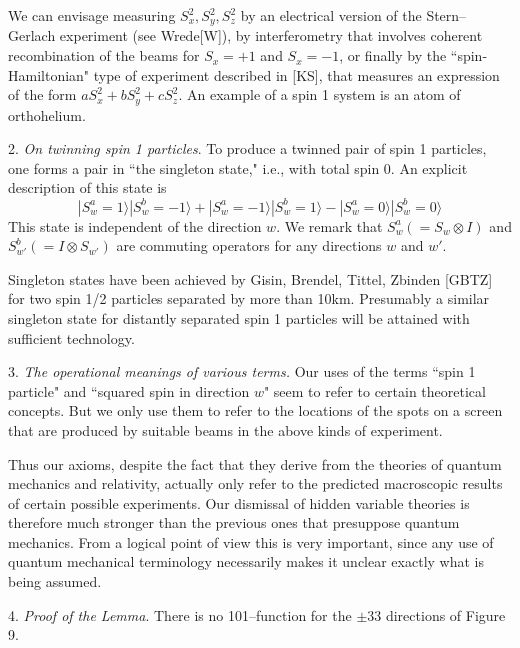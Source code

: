 \documentclass[12pt]{amsart}
\begin{document}
We can envisage measuring $S_x^2, S_y^2, S_z^2$ by an electrical 
version of the Stern--Gerlach experiment (see  Wrede[W]), 
by interferometry that involves coherent recombination of the beams 
for $S_x = +1$ and $S_x = -1$, or finally by the ``spin-Hamiltonian" 
type of experiment described in [KS], that measures an 
expression of the form $aS_x^2 + bS_y^2 + cS_z^2$. 
An example of a spin 1 system is an atom of orthohelium.

2.  {\it On twinning spin 1 particles}.  To produce a twinned pair of 
spin 1 particles, one forms a pair in ``the singleton state," i.e., 
with total spin $0$.  An explicit description of this state is  
$$
|S_w^a=1 \rangle |S_w^b=-1 \rangle +|S_w^a=-1 \rangle
    |S_w^b=1 \rangle - |S_w^a=0 \rangle |S_w^b=0 \rangle
$$ 
This state is independent of the direction $w$. 
We remark that $S_w^a (= S_w \otimes I)$ and
$S_{w'}^b (= I \otimes S_{w'})$ are commuting operators for 
any directions $w$ and $w'$.

Singleton states have been achieved by Gisin, Brendel, Tittel, Zbinden [GBTZ] 
for two spin 1/2 particles separated by more than 10km. 
Presumably a similar singleton state for distantly
separated spin 1 particles will be attained with sufficient technology. 

3. {\it The operational meanings of various terms.} 
Our uses of the terms 
``spin 1 particle" and ``squared spin in direction $w$" seem to refer to 
certain theoretical concepts.  But we only use them to refer to the locations
of the spots on a screen that are produced by suitable beams in the above
kinds of experiment.

Thus our axioms, despite the fact that they derive from the theories of quantum 
mechanics and relativity, actually only refer to the predicted macroscopic 
results of certain possible experiments.  Our dismissal of hidden variable 
theories is therefore much stronger than the previous ones that presuppose 
quantum mechanics.  From a logical point of view this is very
important, since any use of quantum mechanical terminology necessarily 
makes it unclear exactly what is being assumed.

4. {\it  Proof of the Lemma}.
There is no 101--function for the $\pm 33$ directions of Figure 9.
\end{document}
